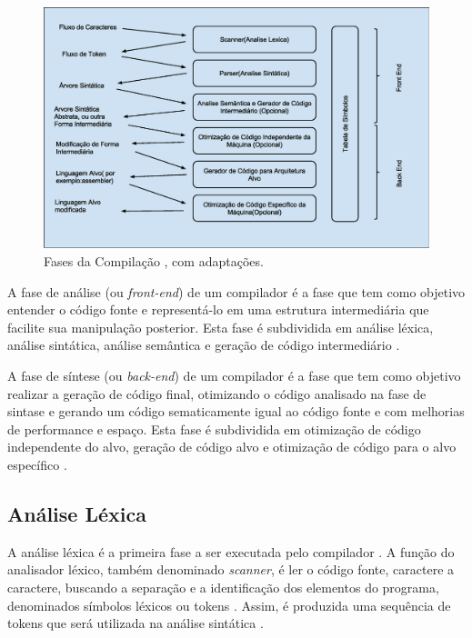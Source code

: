 \begin{figure}[h]
    \centering
        \includegraphics[keepaspectratio=true,scale=0.45]{figuras/fases_da_compilacao.eps}
    \caption{Fases da Compilação \cite[pág. 26]{ref6}, com adaptações.}
    \label{fig01}
\end{figure}

A fase de análise (ou \textit{front-end}) de um compilador é a fase que 
tem como objetivo entender o código fonte e  representá-lo em uma 
estrutura intermediária que facilite sua manipulação posterior. 
Esta fase é subdividida em análise léxica, análise sintática, 
análise semântica e geração de código intermediário \cite[pág. 36]{ref6}.

A fase de síntese (ou \textit{back-end}) de um compilador é a fase que tem 
como objetivo realizar a geração de código final, otimizando o código 
analisado na fase de sintase e gerando um código sematicamente igual ao 
código fonte e com melhorias de performance e espaço. Esta fase é 
subdividida em otimização de código independente do alvo, geração de 
código alvo e otimização de código para o alvo específico \cite[pág. 36]{ref6}.

\subsection{Análise Léxica}
    
A análise léxica é a primeira fase a ser executada pelo compilador \cite[pág. 59]{ref15}. 
A função do analisador léxico, também denominado \textit{scanner}, é ler o código fonte, 
caractere a caractere, buscando a separação e  a identificação dos elementos do 
programa, denominados símbolos léxicos ou tokens \cite[pág. 195]{ref16}. Assim, é 
produzida uma sequência de tokens que será utilizada na análise sintática \cite[pág. 38]{ref3}. 

